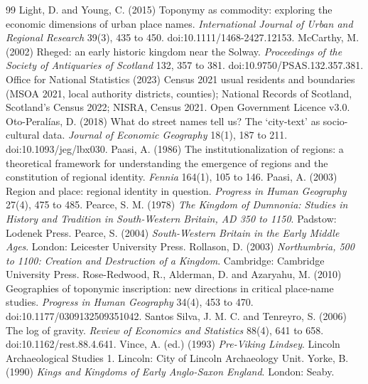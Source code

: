 \documentclass[11pt,a4paper]{article}
\begin{document}
\begin{thebibliography}{99}
 Light, D. and Young, C. (2015) Toponymy as commodity: exploring the economic dimensions of urban place names. \textit{International Journal of Urban and Regional Research} 39(3), 435 to 450. doi:10.1111/1468-2427.12153.
 McCarthy, M. (2002) Rheged: an early historic kingdom near the Solway. \textit{Proceedings of the Society of Antiquaries of Scotland} 132, 357 to 381. doi:10.9750/PSAS.132.357.381.
 Office for National Statistics (2023) Census 2021 usual residents and boundaries (MSOA 2021, local authority districts, counties); National Records of Scotland, Scotland's Census 2022; NISRA, Census 2021. Open Government Licence v3.0.
 Oto-Peralías, D. (2018) What do street names tell us? The `city-text' as socio-cultural data. \textit{Journal of Economic Geography} 18(1), 187 to 211. doi:10.1093/jeg/lbx030.
 Paasi, A. (1986) The institutionalization of regions: a theoretical framework for understanding the emergence of regions and the constitution of regional identity. \textit{Fennia} 164(1), 105 to 146.
 Paasi, A. (2003) Region and place: regional identity in question. \textit{Progress in Human Geography} 27(4), 475 to 485.
 Pearce, S. M. (1978) \textit{The Kingdom of Dumnonia: Studies in History and Tradition in South-Western Britain, AD 350 to 1150}. Padstow: Lodenek Press.
 Pearce, S. (2004) \textit{South-Western Britain in the Early Middle Ages}. London: Leicester University Press.
 Rollason, D. (2003) \textit{Northumbria, 500 to 1100: Creation and Destruction of a Kingdom}. Cambridge: Cambridge University Press.
 Rose-Redwood, R., Alderman, D. and Azaryahu, M. (2010) Geographies of toponymic inscription: new directions in critical place-name studies. \textit{Progress in Human Geography} 34(4), 453 to 470. doi:10.1177/0309132509351042.
 Santos Silva, J. M. C. and Tenreyro, S. (2006) The log of gravity. \textit{Review of Economics and Statistics} 88(4), 641 to 658. doi:10.1162/rest.88.4.641.
 Vince, A. (ed.) (1993) \textit{Pre-Viking Lindsey}. Lincoln Archaeological Studies 1. Lincoln: City of Lincoln Archaeology Unit.
 Yorke, B. (1990) \textit{Kings and Kingdoms of Early Anglo-Saxon England}. London: Seaby.
\end{thebibliography}
\end{document}
